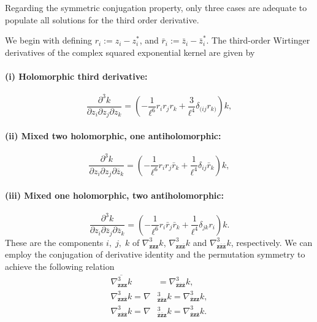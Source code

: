 Regarding the symmetric conjugation property, only three cases are adequate to populate all solutions for the third order derivative.

We begin with defining \( r_i := z_i - z_i^* \), and \( \bar{r}_i := \bar{z}_i - \bar{z}_i^* \). The third-order Wirtinger derivatives of the complex squared exponential kernel
are given by
\paragraph{(i) Holomorphic third derivative:}
\begin{equation} \label{equ:A.30}
\boxed{
\frac{\partial^3 k}{\partial z_i \partial z_j \partial z_k}
= \left( 
  -\frac{1}{\ell^6} r_i r_j r_k 
  + \frac{3}{\ell^4} \delta_{(ij} r_{k)} 
\right) k,
}
\end{equation}

\paragraph{(ii) Mixed two holomorphic, one antiholomorphic:}
\begin{equation} \label{equ:A.31}
\boxed{
\frac{\partial^3 k}{\partial z_i \partial z_j \partial \overline{z}_k}
= \left( 
  -\frac{1}{\ell^6} r_i r_j \bar{r}_k 
  + \frac{1}{\ell^4} \delta_{ij} \bar{r}_k 
\right) k,
}
\end{equation}

\paragraph{(iii) Mixed one holomorphic, two antiholomorphic:}
\begin{equation} \label{equ:A.32}
\boxed{
\frac{\partial^3 k}{\partial z_i \partial \overline{z}_j \partial \overline{z}_k}
= \left( 
  -\frac{1}{\ell^6} r_i \bar{r}_j \bar{r}_k 
  + \frac{1}{\ell^4} \delta_{jk} r_i 
\right) k.
}
\end{equation}
These are the components $i,\;j,\;k$ of $\nabla^{3}_{\mathbf{z}\mathbf{z}\mathbf{z}}k$, $\nabla^{3}_{\mathbf{z}\mathbf{z}\overline{\mathbf{z}}}k$  and $\nabla^{3}_{\mathbf{z}\overline{\mathbf{z}}\overline{\mathbf{z}}}k$, respectively.
We can employ the conjugation of derivative identity and the permutation symmetry to achieve the following relation
\begin{align} 
 \overline{\nabla^{3}_{\mathbf{z}\mathbf{z}\mathbf{z}}k} &= \nabla^{3}_{\overline{\mathbf{z}}\overline{\mathbf{z}}\overline{\mathbf{z}}}k, \label{equ:A.33}\\ 
 \nabla^{3}_{\mathbf{z}\mathbf{z}\overline{\mathbf{z}}}k = \nabla&^{3}_{\mathbf{z}\overline{\mathbf{z}}\mathbf{z}}k = 
 \nabla ^{3}_{\overline{\mathbf{z}}\mathbf{z}\mathbf{z}}k, \label{equ:A.34}\\
 \nabla^{3}_{\mathbf{z}\overline{\mathbf{z}}\overline{\mathbf{z}}}k =
 \nabla&^{3}_{\overline{\mathbf{z}}\overline{\mathbf{z}}\mathbf{z}}k = 
 \nabla ^{3}_{\overline{\mathbf{z}}\mathbf{z}\overline{\mathbf{z}}}k. \label{equ:A.35}
\end{align}

